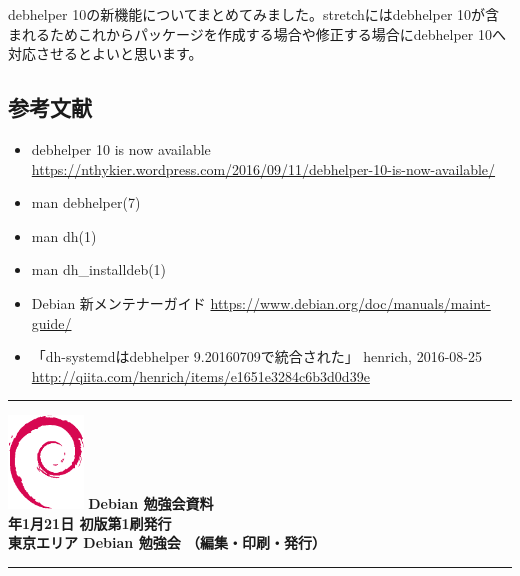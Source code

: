 \documentclass[mingoth,a4paper]{jsarticle}
\newcommand{\debmtgyear}{2017}
\newcommand{\debmtgmonth}{1}
\newcommand{\debmtgdate}{21}
\begin{document}
debhelper 10の新機能についてまとめてみました。stretchにはdebhelper 10が含まれるためこれからパッケージを作成する場合や修正する場合にdebhelper 10へ対応させるとよいと思います。


\subsection{参考文献}

\begin{itemize}
\item debhelper 10 is now available \url{https://nthykier.wordpress.com/2016/09/11/debhelper-10-is-now-available/}
\item man debhelper(7)
\item man dh(1)
\item man dh\_installdeb(1)
\item Debian 新メンテナーガイド \url{https://www.debian.org/doc/manuals/maint-guide/}
\item 「dh-systemdはdebhelper 9.20160709で統合された」 henrich, 2016-08-25 \url{http://qiita.com/henrich/items/e1651e3284c6b3d0d39e}
\end{itemize}


%
\mbox{}\newpage
\mbox{}\newpage
\mbox{}\newpage


\vspace*{15cm}
\hrule
\vspace{2mm}
\includegraphics[width=2cm]{image200502/openlogo-nd.eps}
\noindent \Large \bf Debian 勉強会資料\\
\noindent \normalfont \debmtgyear{}年\debmtgmonth{}月\debmtgdate{}日 \hspace{5mm}  初版第1刷発行\\
\noindent \normalfont 東京エリア Debian 勉強会 （編集・印刷・発行）\\
\hrule
\end{document}
